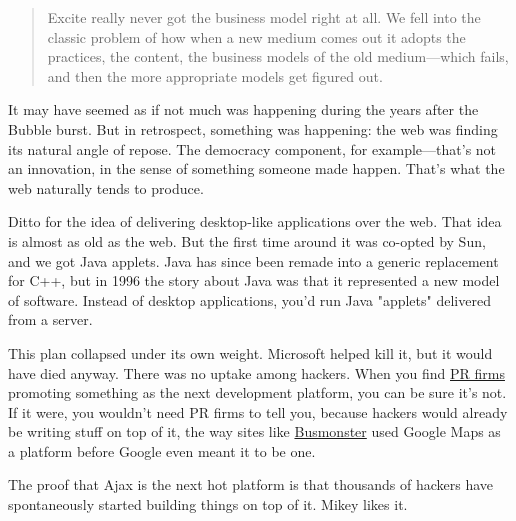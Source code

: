                   \begin{quote}

                    Excite really never got the business model right at all. We
                    fell into the classic problem of how when a new medium comes
                    out it adopts the practices, the content, the business
                    models of the old medium---which fails, and then the
                    more appropriate models get figured out.
                  
\end{quote}

                  It may have seemed as if not much was happening during the
                  years after the Bubble burst. But in retrospect, something was
                  happening: the web was finding its natural angle of repose.
                  The democracy component, for example---that's not an
                  innovation, in the sense of something someone made happen.
                  That's what the web naturally tends to produce.

Ditto
                  for the idea of delivering desktop-like applications over the
                  web. That idea is almost as old as the web. But the first time
                  around it was co-opted by Sun, and we got Java applets. Java
                  has since been remade into a generic replacement for C++, but
                  in 1996 the story about Java was that it represented a new
                  model of software. Instead of desktop applications, you'd run
                  Java "applets" delivered from a server.

This plan
                  collapsed under its own weight. Microsoft helped kill it, but
                  it would have died anyway. There was no uptake among hackers.
                  When you find \href{http://www.paulgraham.com/submarine.html}{PR firms} promoting
                  something as the next development platform, you can be sure
                  it's not. If it were, you wouldn't need PR firms to tell you,
                  because hackers would already be writing stuff on top of it,
                  the way sites like
                  \href{http://busmonster.com}{Busmonster} used Google
                  Maps as a platform before Google even meant it to be one.

The
                  proof that Ajax is the next hot platform is that thousands of
                  hackers have spontaneously started building things on top of
                  it. Mikey likes it.

